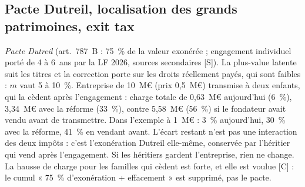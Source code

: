 \subsection{Pacte Dutreil, localisation des grands patrimoines, exit tax}

\emph{Pacte Dutreil} (art.~787~B : 75~\% de la valeur exonérée ; engagement individuel porté de 4 à 6~ans par la
LF 2026, sources secondaires [S]). La plus-value latente suit les titres et la correction porte sur les droits
réellement payés, qui sont faibles : $m$ vaut 5 à 10~\%. Entreprise de 10~M€ (prix 0,5~M€) transmise à deux enfants,
qui la cèdent après l'engagement : charge totale de 0,63~M€ aujourd'hui (6~\%), 3,34~M€ avec la réforme (33~\%), contre
5,58~M€ (56~\%) si le fondateur avait vendu avant de transmettre. Dans l'exemple à 1~M€ : 3~\% aujourd'hui, 30~\% avec
la réforme, 41~\% en vendant avant. L'écart restant n'est pas une interaction des deux impôts : c'est l'exonération
Dutreil elle-même, conservée par l'héritier qui vend après l'engagement. Si les héritiers gardent l'entreprise, rien ne
change. La hausse de charge pour les familles qui cèdent est forte, et elle est voulue [C] : le cumul « 75~\%
d'exonération + effacement » est supprimé, pas le pacte.

